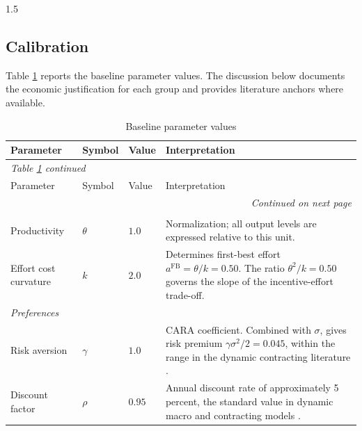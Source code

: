 \documentclass[12pt]{article}
\theoremstyle{definition}
\theoremstyle{plain}
\begin{document}
\begin{spacing}{1.5}
\subsection{Calibration}\label{subsec:calibration}
 
Table \ref{tab:params} reports the baseline parameter values. The discussion below documents the economic justification for each group and provides literature anchors where available.
 
\begingroup
\small
\setlength{\LTcapwidth}{\textwidth}
\begin{longtable}{lllp{7cm}}
\caption{Baseline parameter values}
\label{tab:params} \\
\toprule
Parameter & Symbol & Value & Interpretation \\
\midrule
\endfirsthead
\multicolumn{4}{l}{\small\textit{Table \ref{tab:params} continued}} \\[2pt]
\toprule
Parameter & Symbol & Value & Interpretation \\
\midrule
\endhead
\midrule
\multicolumn{4}{r}{\small\textit{Continued on next page}} \\
\endfoot
\bottomrule
\endlastfoot
 
\multicolumn{4}{l}{\textit{Technology}} \\[2pt]
Productivity & $\theta$ & $1.0$ &
  Normalization; all output levels are expressed relative to this unit. \\
Effort cost curvature & $k$ & $2.0$ &
  Determines first-best effort $a^{\mathrm{FB}} = \theta/k = 0.50$.
  The ratio $\theta^{2}/k = 0.50$ governs the slope of the incentive-effort trade-off. \\[6pt]
 
\multicolumn{4}{l}{\textit{Preferences}} \\[2pt]
Risk aversion & $\gamma$ & $1.0$ &
  CARA coefficient. Combined with $\sigma$, gives risk premium $\gamma\sigma^{2}/2 = 0.045$,
  within the range in the dynamic contracting literature \parencite{holmstrom1987, haubrich1994}. \\
Discount factor & $\rho$ & $0.95$ &
  Annual discount rate of approximately 5 percent, the standard
  value in dynamic macro and contracting models \parencite{stokey1989}. \\[6pt]
 

\end{longtable}
\end{spacing}
\end{document}
